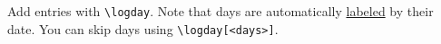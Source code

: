 \documentclass{journal}
\author{Alice Atwood \and Bob Benston}
\begin{document}
\maketitle

\tableofcontents


\timelines %

\listofissues



\logday
Add entries with \verb|\logday|. Note that days are automatically
\hyperref[2022-12-03]{labeled} by their date. You can skip days using
\verb|\logday[<days>]|.



\end{document}
